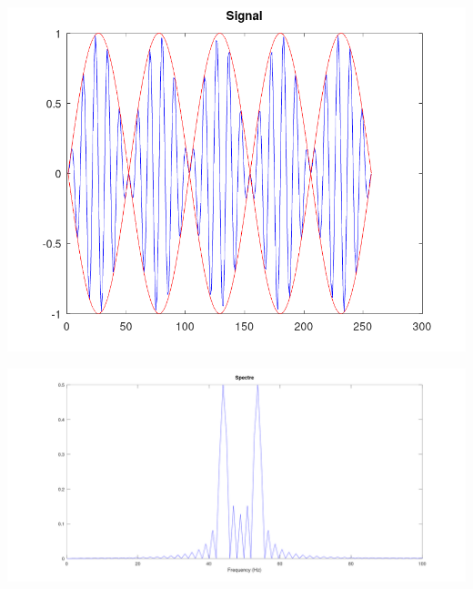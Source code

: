 \begin{enumerate}
        \begin{center}
            \centering
            \includegraphics[width=\textwidth]{../octave/modulation/signal/am.png}
            \label{img:modulation-signal}
        \end{center}
        \begin{center}
            \centering
            \includegraphics[width=\textwidth]{../octave/modulation/spectre/am.png}
            \label{img:modulation-spectre}
        \end{center}
\end{enumerate}

